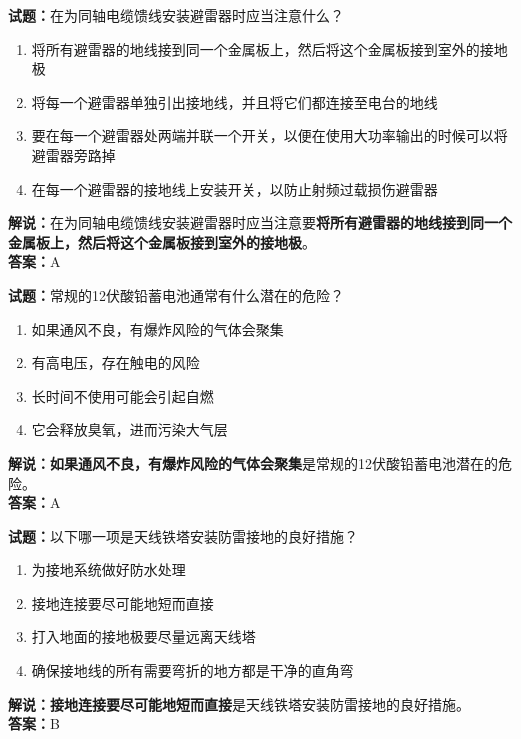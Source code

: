 \documentclass{ctexbook}
\begin{document}
\noindent\textbf{试题：}在为同轴电缆馈线安装避雷器时应当注意什么？
\begin{enumerate}[leftmargin=3em]
	\item 将所有避雷器的地线接到同一个金属板上，然后将这个金属板接到室外的接地极
	\item 将每一个避雷器单独引出接地线，并且将它们都连接至电台的地线
	\item 要在每一个避雷器处两端并联一个开关，以便在使用大功率输出的时候可以将避雷器旁路掉
	\item 在每一个避雷器的接地线上安装开关，以防止射频过载损伤避雷器
\end{enumerate}
\noindent\textbf{解说：}在为同轴电缆馈线安装避雷器时应当注意要\textbf{将所有避雷器的地线接到同一个金属板上，然后将这个金属板接到室外的接地极}。\\\noindent\textbf{答案：}A


\bigskip



\noindent\textbf{试题：}常规的12伏酸铅蓄电池通常有什么潜在的危险？
\begin{enumerate}[leftmargin=3em]
	\item 如果通风不良，有爆炸风险的气体会聚集
	\item 有高电压，存在触电的风险
	\item 长时间不使用可能会引起自燃
	\item 它会释放臭氧，进而污染大气层
\end{enumerate}
\noindent\textbf{解说：}\textbf{如果通风不良，有爆炸风险的气体会聚集}是常规的12伏酸铅蓄电池潜在的危险。\\\noindent\textbf{答案：}A


\bigskip



\noindent\textbf{试题：}以下哪一项是天线铁塔安装防雷接地的良好措施？
\begin{enumerate}[leftmargin=3em]
	\item 为接地系统做好防水处理
	\item 接地连接要尽可能地短而直接
	\item 打入地面的接地极要尽量远离天线塔
	\item 确保接地线的所有需要弯折的地方都是干净的直角弯
\end{enumerate}
\noindent\textbf{解说：}\textbf{接地连接要尽可能地短而直接}是天线铁塔安装防雷接地的良好措施。\\\noindent\textbf{答案：}B


\bigskip
\end{document}
